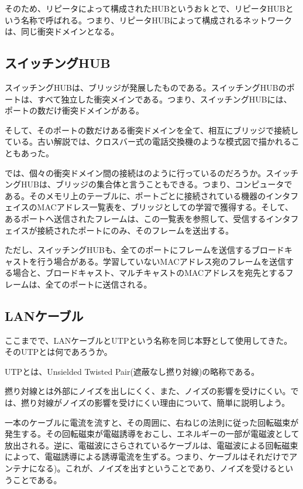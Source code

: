 そのため、リピータによって構成されたHUBというおｋとで、リピータHUBという名称で呼ばれる。つまり、リピータHUBによって構成されるネットワークは、同じ衝突ドメインとなる。

\subsection{スイッチングHUB}

スイッチングHUBは、ブリッジが発展したものである。スイッチングHUBのポートは、すべて独立した衝突メインである。つまり、スイッチングHUBには、ポートの数だけ衝突ドメインがある。

そして、そのポートの数だけある衝突ドメインを全て、相互にブリッジで接続している。古い解説では、クロスバー式の電話交換機のような模式図で描かれることもあった。

では、個々の衝突ドメイン間の接続はのように行っているのだろうか。スイッチングHUBは、ブリッジの集合体と言うこともできる。つまり、コンピュータである。そのメモリ上のテーブルに、ポートごとに接続されている機器のインタフェイスのMACアドレス一覧表を、ブリッジとしての学習で獲得する。そして、あるポートへ送信されたフレームは、この一覧表を参照して、受信するインタフェイスが接続されたポートにのみ、そのフレームを送出する。

ただし、スイッチングHUBも、全てのポートにフレームを送信するブロードキャストを行う場合がある。学習していないMACアドレス宛のフレームを送信する場合と、ブロードキャスト、マルチキャストのMACアドレスを宛先とするフレームは、全てのポートに送信される。

\subsection{LANケーブル}

ここまでで、LANケーブルとUTPという名称を同じ本野として使用してきた。そのUTPとは何であろうか。

UTPとは、Unsielded Twisted Pair(遮蔽なし撚り対線)の略称である。

撚り対線とは外部にノイズを出しにくく、また、ノイズの影響を受けにくい。では、撚り対線がノイズの影響を受けにくい理由について、簡単に説明しよう。

一本のケーブルに電流を流すと、その周囲に、右ねじの法則に従った回転磁束が発生する。その回転磁束が電磁誘導をおこし、エネルギーの一部が電磁波として放出される。逆に、電磁波にさらされているケーブルは、電磁波による回転磁束によって、電磁誘導による誘導電流を生ずる。つまり、ケーブルはそれだけでアンテナになる)。これが、ノイズを出すということであり、ノイズを受けるということである。

